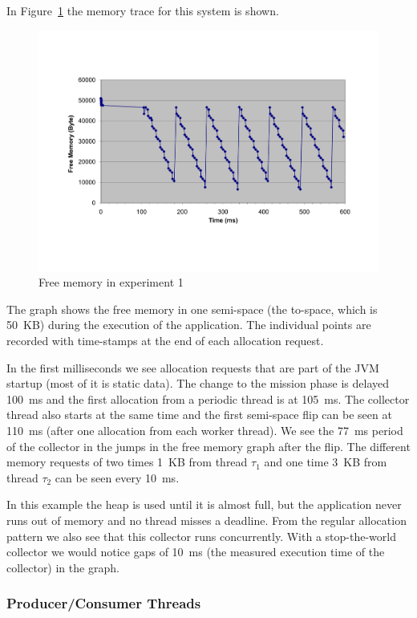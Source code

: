 In Figure~\ref{fig:ex1:mem} the memory trace for this system is
shown.
\begin{figure}
\begin{center}
    \includegraphics[width=\excelwidth]{jvm/gc_ex1}
    \caption{Free memory in experiment 1}
\label{fig:ex1:mem}
\end{center}
\end{figure}
The graph shows the free memory in one semi-space (the to-space,
which is 50~KB) during the execution of the application. The
individual points are recorded with time-stamps at the end of each
allocation request.

In the first milliseconds we see allocation requests that are part
of the JVM startup (most of it is static data). The change to the
mission phase is delayed 100~ms and the first allocation from a
periodic thread is at 105~ms. The collector thread also starts at
the same time and the first semi-space flip can be seen at 110~ms
(after one allocation from each worker thread). We see the 77~ms
period of the collector in the jumps in the free memory graph after
the flip. The different memory requests of two times 1~KB from
thread $\tau_1$ and one time 3~KB from thread $\tau_2$ can be seen
every 10~ms.

In this example the heap is used until it is almost full, but the
application never runs out of memory and no thread misses a deadline.
From the regular allocation pattern we also see that this collector
runs concurrently. With a stop-the-world collector we would notice
gaps of 10~ms (the measured execution time of the collector) in the
graph.

\subsubsection{Producer/Consumer Threads}

